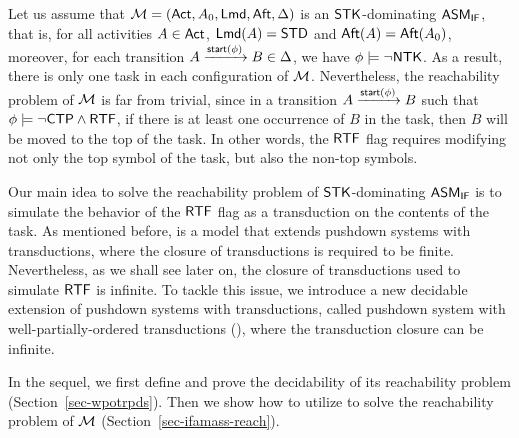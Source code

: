 
Let us assume that ${\mathcal{M} } = ({\sf Act}, A_0, {\sf Lmd}, {\sf Aft}, \Delta)$ is an $\mathsf{STK}$-dominating $\textsf{ASM}_\textsf{IF}$, that is, for all activities $A \in {\sf Act}$, ${\sf Lmd}(A) = {\sf STD}$ and ${\sf Aft}(A) = {\sf Aft}(A_0)$, moreover, for each transition $A \xrightarrow{{\mathsf{start} }(\phi)} B \in \Delta$, we have $\phi \models \neg {\sf NTK}$. As a result, there is only one task in each configuration of ${\mathcal{M} }$.
Nevertheless, the reachability problem of ${\mathcal{M} }$ is far from trivial, since in a transition $A \xrightarrow{{\mathsf{start} }(\phi)} B$ such that $\phi \models \neg {\sf CTP} \wedge {\sf RTF}$, if there is at least one occurrence of $B$ in the task, then $B$ will be moved to the top of the task. In other words, the ${\sf RTF}$ flag requires modifying not only the top symbol of the task, but also the non-top symbols. 

Our main idea to solve the reachability problem of $\mathsf{STK}$-dominating $\textsf{ASM}_\textsf{IF}$ is to simulate the behavior of the ${\sf RTF}$ flag as a transduction on the contents of the task. As mentioned before, {\TrPDS} is a model that extends pushdown systems with transductions, where the closure of transductions is required to be finite. Nevertheless, as we shall see later on, the closure of transductions used to simulate ${\sf RTF}$ is infinite. To tackle this issue, we introduce a new decidable extension of pushdown systems with transductions, called pushdown system with well-partially-ordered transductions (\WOTrPDS), where the transduction closure can be infinite. 

In the sequel, we first define {\WOTrPDS} and prove the decidability of its reachability problem (Section~\ref{sec-wpotrpds}). Then we show how to utilize {\WOTrPDS} to solve the reachability problem of ${\mathcal{M} }$ (Section~\ref{sec-ifamass-reach}). 

